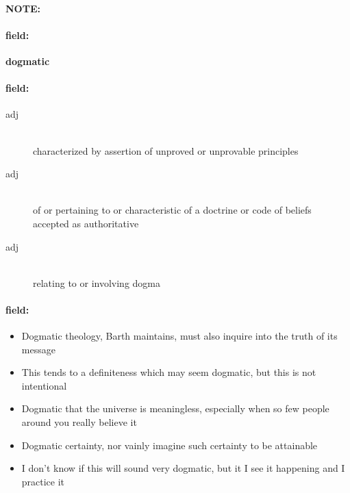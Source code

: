 \documentclass[12pt]{article}
\newenvironment{note}{\paragraph{NOTE:}}{}
\newenvironment{field}{\paragraph{field:}}{}
\begin{document}
\begin{note}
\begin{field}
\textbf{\large dogmatic}
\end{field}


\begin{field}
\begin{description}
\item[adj] \hfill \\ 
characterized by assertion of unproved or unprovable principles

\item[adj] \hfill \\ 
of or pertaining to or characteristic of a doctrine or code of beliefs accepted as authoritative

\item[adj] \hfill \\ 
relating to or involving dogma

\end{description}
\end{field}

\begin{field}
\begin{itemize}
\item Dogmatic theology, Barth maintains, must also inquire into the truth of its message
\item This tends to a definiteness which may seem dogmatic, but this is not intentional
\item Dogmatic that the universe is meaningless, especially when so few people around you really believe it
\item Dogmatic certainty, nor vainly imagine such certainty to be attainable
\item I don't know if this will sound very dogmatic, but it I see it happening and I practice it
\end{itemize}
\end{field}
\end{note}
\end{document}
